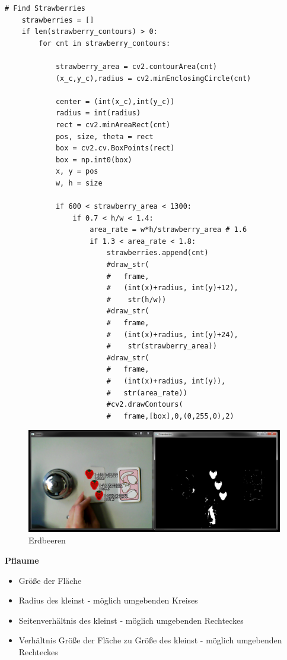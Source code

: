 \lstset{language=Python}
\begin{lstlisting}[]
# Find Strawberries
    strawberries = []
    if len(strawberry_contours) > 0:
        for cnt in strawberry_contours:

            strawberry_area = cv2.contourArea(cnt)
            (x_c,y_c),radius = cv2.minEnclosingCircle(cnt)

            center = (int(x_c),int(y_c))
            radius = int(radius)
            rect = cv2.minAreaRect(cnt)
            pos, size, theta = rect
            box = cv2.cv.BoxPoints(rect)
            box = np.int0(box)
            x, y = pos
            w, h = size
            
            if 600 < strawberry_area < 1300:
                if 0.7 < h/w < 1.4:
                    area_rate = w*h/strawberry_area # 1.6
                    if 1.3 < area_rate < 1.8:
                        strawberries.append(cnt)
                        #draw_str(
                        #   frame,
                        #   (int(x)+radius, int(y)+12),
                        #    str(h/w))
                        #draw_str(
                        #   frame,
                        #   (int(x)+radius, int(y)+24),
                        #    str(strawberry_area))
                        #draw_str(
                        #   frame,
                        #   (int(x)+radius, int(y)), 
                        #   str(area_rate))
                        #cv2.drawContours(
                        #   frame,[box],0,(0,255,0),2)
\end{lstlisting}
\begin{figure}[H]
    \centering
    \includegraphics[width=\textwidth]{Abbildungen/Erdbeeren03}
    \caption[]{Erdbeeren}
    \label{fig:Erdbeeren03}
\end{figure}

\textbf{Pflaume}

\begin{itemize}
    \item Größe der Fläche
    \item Radius des kleinst - möglich umgebenden Kreises
    \item Seitenverhältnis des kleinst - möglich umgebenden Rechteckes
     \item Verhältnis Größe der Fläche zu Größe des kleinst - möglich umgebenden Rechteckes
\end{itemize}

